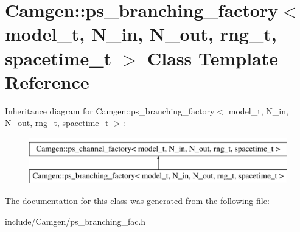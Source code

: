 \hypertarget{a00446}{}\section{Camgen\+:\+:ps\+\_\+branching\+\_\+factory$<$ model\+\_\+t, N\+\_\+in, N\+\_\+out, rng\+\_\+t, spacetime\+\_\+t $>$ Class Template Reference}
\label{a00446}
Inheritance diagram for Camgen\+:\+:ps\+\_\+branching\+\_\+factory$<$ model\+\_\+t, N\+\_\+in, N\+\_\+out, rng\+\_\+t, spacetime\+\_\+t $>$\+:\begin{figure}[H]
\begin{center}
\leavevmode
\includegraphics[height=2.000000cm]{a00446}
\end{center}
\end{figure}


The documentation for this class was generated from the following file\+:\begin{DoxyCompactItemize}
\item 
include/\+Camgen/ps\+\_\+branching\+\_\+fac.\+h\end{DoxyCompactItemize}

